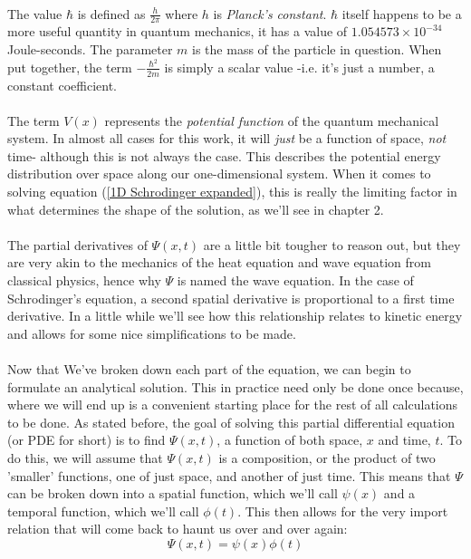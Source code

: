 \documentclass[12pt,letterpaper]{book}
\begin{document}
\paragraph*{}The value $\hbar$ is defined as $\frac{h}{2\pi}$ where $h$ is \textit{Planck's constant}. $\hbar$ itself happens to be a more useful quantity in quantum mechanics, it has a value of $1.054573\times 10^{-34}$ Joule-seconds. The parameter $m$ is the mass of the particle in question. When put together, the term $-\frac{\hbar^2}{2m}$ is simply a scalar value -i.e. it's just a number, a constant coefficient.
\paragraph*{}The term $V(x)$ represents the \textit{potential function} of the quantum mechanical system. In almost all cases for this work, it will \textit{just} be a function of space, \textit{not} time- although this is not always the case. This describes the potential energy distribution over space along our one-dimensional system. When it comes to solving equation (\ref{1D Schrodinger expanded}), this is really the limiting factor in what determines the shape of the solution, as we'll see in chapter 2.
\paragraph*{}The partial derivatives of $\Psi(x,t)$ are a little bit tougher to reason out, but they are very akin to the mechanics of the heat equation and wave equation from classical physics, hence why $\Psi$ is named the wave equation. In the case of Schrodinger's equation, a second spatial derivative is proportional to a first time derivative. In a little while we'll see how this relationship relates to kinetic energy and allows for some nice simplifications to be made.
\paragraph*{}Now that We've broken down each part of the equation, we can begin to formulate an analytical solution. This in practice need only be done once because, where we will end up is a convenient starting place for the rest of all calculations to be done. As stated before, the goal of solving this partial differential equation (or PDE for short) is to find $\Psi(x,t)$, a function of both space, $x$ and time, $t$. To do this, we will assume that $\Psi(x,t)$ is a composition, or the product of two 'smaller' functions, one of just space, and another of just time. This means that $\Psi$ can be broken down into a spatial function, which we'll call $\psi(x)$ and a temporal function, which we'll call $\phi(t)$. This then allows for the very import relation that will come back to haunt us over and over again:
\begin{equation}
\label{separable}
\Psi(x,t) = \psi(x)\phi(t)
\end{equation}
\end{document}
